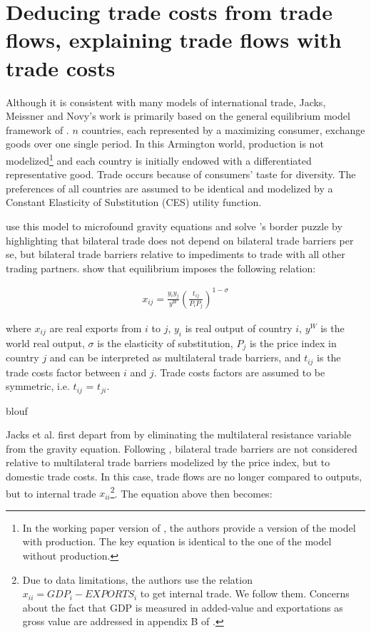 \documentclass{article}
\begin{document}
\section{\label{1} Deducing trade costs from trade flows, explaining trade flows with trade costs}

Although it is consistent with many models of international
trade, Jacks, Meissner and Novy's work is primarily based on
the general equilibrium model framework of \cite{AW2003}. $n$
countries, each represented by a maximizing consumer, exchange
goods over one single period. In this Armington world,
production is not modelized\footnote{In the working paper
version of \cite{JMN2010}, the authors provide a version of the
model with production. The key equation is identical to the one
of the model without production.} and each country is initially
endowed with a differentiated representative good. Trade occurs
because of consumers' taste for diversity. The preferences of
all countries are assumed to be identical and modelized by a
Constant Elasticity of Substitution (CES) utility function.

\cite{AW2003} use this model to microfound gravity equations
and solve \cite{MAC}'s border puzzle by highlighting that
bilateral trade does not depend on bilateral trade barriers per
se, but bilateral trade barriers relative to impediments to
trade with all other trading partners. \cite{AW2003} show that
equilibrium imposes the following relation:

\begin{eqnarray}
x_{ij}=\frac{y_i y_j}{y^W}\left(\frac{t_{ij}}{P_i P_j}\right)^{1-\sigma}
\end{eqnarray}

where $x_{ij}$ are real exports from $i$ to $j$, $y_i$ is real
output of country $i$, $y^W$ is the world real output, $\sigma$
is the elasticity of substitution, $P_j$ is the price index in
country $j$ and can be interpreted as multilateral trade
barriers, and $t_{ij}$ is the trade costs factor between $i$
and $j$. Trade costs factors are assumed to be symmetric, i.e.
$t_{ij}$ = $t_{ji}$.

blouf

Jacks et al. first depart from \cite{AW2003} by eliminating the
multilateral resistance variable from the gravity equation.
Following \cite{NOVY}, bilateral trade barriers are not
considered relative to multilateral trade barriers modelized by
the price index, but to domestic trade costs. In this case,
trade flows are no longer compared to outputs, but to internal
trade $x_{ii}$\footnote{Due to data limitations, the authors
use the relation $x_{ii}=GDP_i-EXPORTS_i$ to get internal
trade. We follow them. Concerns about the fact that GDP is
measured in added-value and exportations as gross value are
addressed in appendix B of \cite{JMN2011}.}. The equation above
then becomes:
\end{document}
